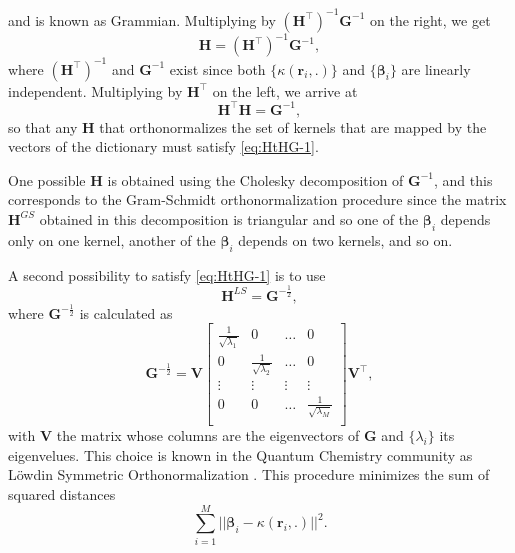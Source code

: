 and is known as Grammian.
Multiplying by $\left(\mathbf{H}^{\top}\right)^{-1}\mathbf{G}^{-1}$ on the right, we get
\begin{equation}
    \mathbf{H} = \left(\mathbf{H}^{\top}\right)^{-1}\mathbf{G}^{-1},
\end{equation}
where $\left(\mathbf{H}^{\top}\right)^{-1}$ and $\mathbf{G}^{-1}$ exist since both $\{\kappa(\mathbf{r}_i,.)\}$ and $\{\boldsymbol{\beta}_i\}$ are linearly independent.
Multiplying by $\mathbf{H}^{\top}$ on the left, we arrive at
\begin{equation}
    \mathbf{H}^{\top}\mathbf{H} = \mathbf{G}^{-1},\label{eq:HtHG-1}
\end{equation}
so that any $\mathbf{H}$ that orthonormalizes the set of kernels that are mapped by the vectors of the dictionary must satisfy \eqref{eq:HtHG-1}.

One possible $\mathbf{H}$ is obtained using the Cholesky decomposition of $\mathbf{G}^{-1}$, and this corresponds to the Gram-Schmidt orthonormalization procedure since the matrix $\mathbf{H}^{GS}$ obtained in this decomposition is triangular and so one of the $\boldsymbol{\beta}_i$ depends only on one kernel, another of the $\boldsymbol{\beta}_i$ depends on two kernels, and so on.

A second possibility to satisfy \eqref{eq:HtHG-1} is to use 
\begin{equation}
    \mathbf{H}^{LS} = \mathbf{G}^{-\frac{1}{2}},
\end{equation}
where $\mathbf{G}^{-\frac{1}{2}}$ is calculated as
\begin{equation}
    \mathbf{G}^{-\frac{1}{2}} = \mathbf{V}\left[\begin{matrix}
        \frac{1}{\sqrt{\lambda_1}} & 0 & \dots & 0\\
        0 & \frac{1}{\sqrt{\lambda_2}} & \dots & 0\\
        \vdots & \vdots & \vdots & \vdots\\
        0 & 0 & \dots & \frac{1}{\sqrt{\lambda_M}}\\
    \end{matrix}\right]\mathbf{V}^{\top},
\end{equation}
with $\mathbf{V}$ the matrix whose columns are the eigenvectors of $\mathbf{G}$ and $\{\lambda_i\}$ its eigenvelues.
This choice is known in the Quantum Chemistry community as Löwdin Symmetric Orthonormalization \cite{mayer_lowdins_2002}. This procedure minimizes the sum of squared distances \cite{carlson_orthogonalization_1957}
\begin{equation}
    \sum_{i=1}^{M} ||\boldsymbol{\beta}_i - \kappa(\mathbf{r}_i,.)||^2.
\end{equation}

